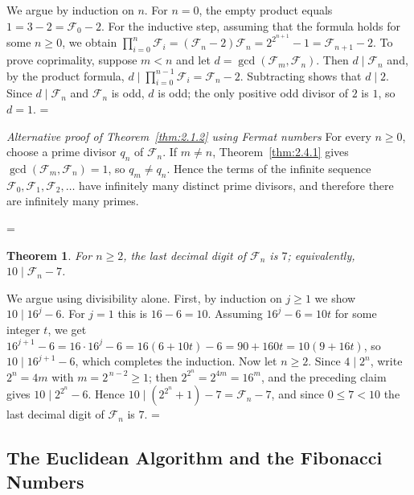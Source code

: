 \documentclass[11pt]{article}
\makeatletter
\let\nt@closedisplay\]
\def\nt@guardedclose{\@ifnextchar\par{\nt@closeafterpar}{\@ifnextchar\end{\postdisplaypenalty\@M\nt@closedisplay}{\nt@closedisplay}}}
\def\nt@closeafterpar\par{\@ifnextchar\par{\nt@closeafterpar}{\@ifnextchar\end{\postdisplaypenalty\@M\nt@closedisplay\par}{\nt@closedisplay\par}}}
\renewenvironment{proof}[1][\proofname]{\par
  \pushQED{\qed}\normalfont\topsep\medskipamount\edef\nt@afterproof{\@endparpenalty=\the\@endparpenalty\relax}\@beginparpenalty\@M\@endparpenalty\@M\let\]\nt@guardedclose\trivlist\item[]\textit{#1\@addpunct{.}} \ignorespaces}{\ifvmode\addpenalty\@M\fi\popQED\nt@afterproof\endtrivlist\@endpefalse}
\theoremstyle{ntstyle}
\newtheorem{theorem}{Theorem}[subsection]
\newenvironment{altproof}[1][\proofname]
  {\begin{proof}[#1]\renewcommand{\qedsymbol}{}}{\end{proof}}
\makeatother
\begin{document}
\begin{proof} We argue by induction on $n$. For $n=0$, the empty
  product equals $1 = 3 - 2 = \mathcal{F}_0 - 2$. For the inductive step,
  assuming that the formula holds for some $n\ge0$, we obtain
  $\prod_{i=0}^{n}\mathcal{F}_i = (\mathcal{F}_n-2)\mathcal{F}_n = 2^{2^{n+1}} - 1 = \mathcal{F}_{n+1}-2$. To prove
  coprimality, suppose $m<n$ and
  let $d=\gcd(\mathcal{F}_m,\mathcal{F}_n)$.
  Then $d\mid\mathcal{F}_n$ and, by the product formula,
  $d\mid\prod_{i=0}^{n-1}\mathcal{F}_i=\mathcal{F}_n-2$.
  Subtracting shows that $d\mid2$. Since $d\mid\mathcal{F}_n$ and
  $\mathcal{F}_n$ is odd, $d$ is odd; the only positive odd divisor of $2$
  is $1$, so $d=1$.
\end{proof}
\label{proof:euclid-fermat}
\begin{altproof}[Alternative proof of Theorem~\ref{thm:2.1.2} using Fermat numbers]
  For every $n\ge0$, choose a prime divisor $q_n$ of $\mathcal{F}_n$.
  If $m\neq n$, Theorem~\ref{thm:2.4.1} gives
  $\gcd(\mathcal{F}_m, \mathcal{F}_n)=1$, so $q_m\neq q_n$. Hence the terms of the
  infinite sequence $\mathcal{F}_0,\mathcal{F}_1,\mathcal{F}_2,\ldots$
  have infinitely many distinct prime divisors, and therefore there are
  infinitely many primes.

\end{altproof}

\begin{theorem}\label{thm:2.4.2}\label{thm:fermat-last-digit} For $n\ge2$, the last
  decimal digit of $\mathcal{F}_n$ is $7$; equivalently, $10\mid \mathcal{F}_n-7$.

\end{theorem}

\begin{proof} We argue using divisibility alone. First, by
  induction on $j\ge1$ we show $10\mid 16^{j}-6$. For $j=1$ this is
  $16-6=10$. Assuming $16^{j}-6=10t$ for some integer $t$, we get
  $16^{j+1}-6=16\cdot16^{j}-6=16(6+10t)-6=90+160t=10(9+16t)$, so $10\mid 16^{j+1}-6$, which completes the
  induction. Now let $n\ge2$. Since $4\mid 2^{n}$, write $2^{n}=4m$ with $m=2^{\,n-2}\ge1$; then
  $2^{2^{n}}=2^{4m}=16^{m}$, and the preceding claim gives $10\mid 2^{2^{n}}-6$.
  Hence $10\mid(2^{2^{n}}+1)-7=\mathcal{F}_n-7$, and since $0\le 7<10$ the
  last decimal digit of $\mathcal{F}_n$ is $7$.
\end{proof}
\subsection{The Euclidean Algorithm and the Fibonacci Numbers}
\end{document}

